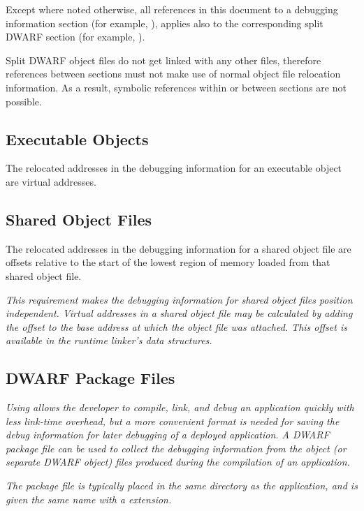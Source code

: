 Except where noted otherwise, all references in this document
to a debugging information section (for example, \dotdebuginfo),
applies also to the corresponding split DWARF section (for example,
\dotdebuginfodwo).

Split DWARF object files do not get linked with any other files,
therefore references between sections must not make use of
normal object file relocation information. As a result, symbolic
references within or between sections are not possible.

\subsection{Executable Objects}
\label{chap:executableobjects}
The relocated addresses in the debugging information for an
executable object are virtual addresses.

\subsection{Shared Object Files}
\label{datarep:sharedobjectfiles}
The relocated
addresses in the debugging information for a shared object file
are offsets relative to the start of the lowest region of
memory loaded from that shared object file.

\textit{This requirement makes the debugging information for
shared object files position independent.  Virtual addresses in a
shared object file may be calculated by adding the offset to the
base address at which the object file was attached. This offset
is available in the run\dash time linker\textquoteright s data structures.}

\subsection{DWARF Package Files}
\label{datarep:dwarfpackagefiles}
\textit{Using  allows the developer to compile, 
link, and debug an application quickly with less link-time overhead,
but a more convenient format is needed for saving the debug
information for later debugging of a deployed application. A
DWARF package file can be used to collect the debugging
information from the object (or separate DWARF object) files
produced during the compilation of an application.}

\textit{The package file is typically placed in the same directory as the
application, and is given the same name with a 
extension.}

